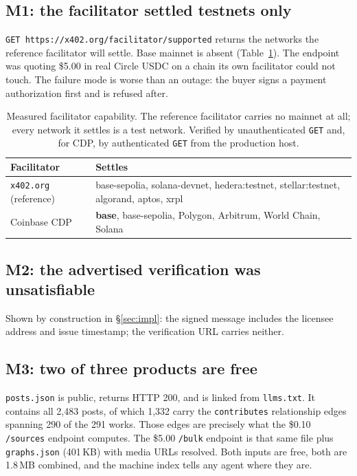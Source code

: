 \documentclass[10pt,letterpaper,twocolumn]{article}
\newcommand{\code}[1]{\texttt{#1}}
\begin{document}
\subsection{M1: the facilitator settled testnets only}

\code{GET https://x402.org/facilitator/supported} returns the networks the
reference facilitator will settle. Base mainnet is absent
(Table~\ref{tab:facilitators}). The endpoint was quoting \$5.00 in real Circle
USDC on a chain its own facilitator could not touch. The failure mode is
worse than an outage: the buyer signs a payment authorization first and is
refused after.

\begin{table}[t]
\centering
\footnotesize
\begin{tabularx}{\columnwidth}{@{}l>{\RaggedRight}X@{}}
\toprule
\textbf{Facilitator} & \textbf{Settles} \\
\midrule
\code{x402.org} (reference) & base-sepolia, solana-devnet, hedera:testnet, stellar:testnet, algorand, aptos, xrpl \\
\addlinespace
Coinbase CDP & \textbf{base}, base-sepolia, Polygon, Arbitrum, World Chain, Solana \\
\bottomrule
\end{tabularx}
\caption{Measured facilitator capability. The reference facilitator carries no
mainnet at all; every network it settles is a test network. Verified by
unauthenticated \code{GET} and, for CDP, by authenticated \code{GET} from the
production host.}
\label{tab:facilitators}
\end{table}

\subsection{M2: the advertised verification was unsatisfiable}

Shown by construction in \S\ref{sec:impl}: the signed message includes the
licensee address and issue timestamp; the verification URL carries neither.

\subsection{M3: two of three products are free}

\code{posts.json} is public, returns HTTP 200, and is linked from
\code{llms.txt}. It contains all 2{,}483 posts, of which 1{,}332 carry the
\code{contributes} relationship edges spanning 290 of the 291 works. Those
edges are precisely what the \$0.10 \code{/sources} endpoint computes. The
\$5.00 \code{/bulk} endpoint is that same file plus \code{graphs.json}
(401\,KB) with media URLs resolved. Both inputs are free, both are 1.8\,MB
combined, and the machine index tells any agent where they are.
\end{document}
